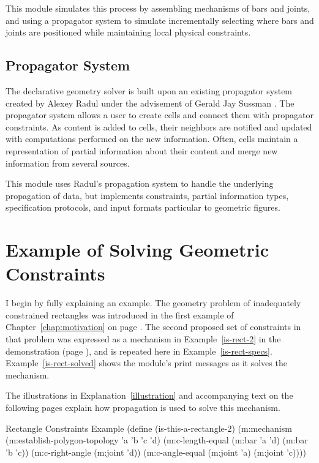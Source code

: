 This module simulates this process by assembling mechanisms of bars
and joints, and using a propagator system to simulate incrementally
selecting where bars and joints are positioned while maintaining local
physical constraints.

\subsection{Propagator System}

The declarative geometry solver is built upon an existing propagator
system created by Alexey Radul under the advisement of Gerald Jay
Sussman \cite{gjs-propagator}. The propagator system allows a user to
create cells and connect them with propagator constraints. As content
is added to cells, their neighbors are notified and updated with
computations performed on the new information. Often, cells maintain a
representation of partial information about their content and merge
new information from several sources.

This module uses Radul's propagation system to handle the underlying
propagation of data, but implements constraints, partial information
types, specification protocols, and input formats particular to geometric
figures.

\section{Example of Solving Geometric Constraints}
\label{sec:example-solving}

I begin by fully explaining an example. The geometry problem of
inadequately constrained rectangles was introduced in the first
example of Chapter~\ref{chap:motivation} on page
\pageref{example-1}. The second proposed set of constraints in that
problem was expressed as a mechanism in Example~\ref{is-rect-2} in the
demonstration (page \pageref{is-rect-2}), and is repeated here in
Example~\ref{is-rect-specs}. Example~\ref{is-rect-solved} shows the
module's print messages as it solves the mechanism.

The illustrations in Explanation~\ref{illustration} and accompanying text
on the following pages explain how propagation is used to solve this
mechanism.

\begin{code-example}
[label=is-rect-specs]
{Rectangle Constraints Example}
(define (is-this-a-rectangle-2)
  (m:mechanism
   (m:establish-polygon-topology 'a 'b 'c 'd)
   (m:c-length-equal (m:bar 'a 'd) (m:bar 'b 'c))
   (m:c-right-angle (m:joint 'd))
   (m:c-angle-equal (m:joint 'a) (m:joint 'c))))
\end{code-example}

